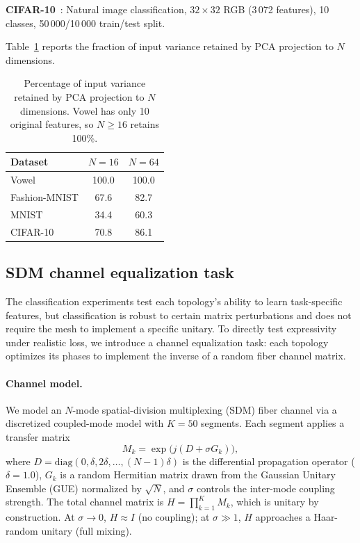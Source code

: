 \documentclass[11pt,a4paper]{article}
\begin{document}
\textbf{CIFAR-10}~\cite{krizhevsky2009}: Natural image classification,
$32 \times 32$ RGB (3\,072 features), 10 classes, 50\,000/10\,000 train/test
split.

Table~\ref{tab:pca} reports the fraction of input variance retained by PCA
projection to $N$ dimensions.

\begin{table}[H]
\centering
\caption{Percentage of input variance retained by PCA projection to $N$ dimensions.
Vowel has only 10 original features, so $N \geq 16$ retains 100\%.}
\label{tab:pca}
\begin{tabular}{lcc}
\toprule
Dataset & $N{=}16$ & $N{=}64$ \\
\midrule
Vowel         & 100.0 & 100.0 \\
Fashion-MNIST &  67.6 &  82.7 \\
MNIST         &  34.4 &  60.3 \\
CIFAR-10      &  70.8 &  86.1 \\
\bottomrule
\end{tabular}
\end{table}


\subsection{SDM channel equalization task}
\label{sec:sdm_methods}

The classification experiments test each topology's ability to learn
task-specific features, but classification is robust to certain matrix
perturbations and does not require the mesh to implement a specific
unitary.  To directly test expressivity under realistic loss, we
introduce a channel equalization task: each topology optimizes its
phases to implement the inverse of a random fiber channel matrix.

\paragraph{Channel model.}
We model an $N$-mode spatial-division multiplexing (SDM) fiber channel
via a discretized coupled-mode model with $K{=}50$ segments.  Each
segment applies a transfer matrix
\begin{equation}
M_k = \exp\bigl(j(D + \sigma G_k)\bigr),
\end{equation}
where $D = \mathrm{diag}(0, \delta, 2\delta, \ldots, (N{-}1)\delta)$
is the differential propagation operator ($\delta = 1.0$),
$G_k$ is a random Hermitian matrix drawn from the Gaussian Unitary
Ensemble (GUE) normalized by $\sqrt{N}$, and $\sigma$ controls the
inter-mode coupling strength.  The total channel matrix is
$H = \prod_{k=1}^{K} M_k$, which is unitary by construction.
At $\sigma \to 0$, $H \approx I$ (no coupling); at $\sigma \gg 1$,
$H$ approaches a Haar-random unitary (full mixing).
\end{document}
